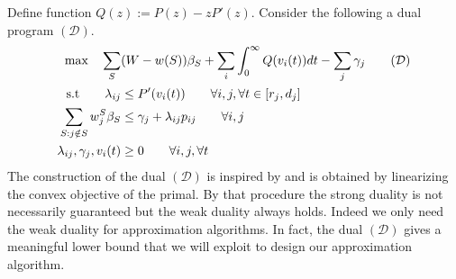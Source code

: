 \documentclass[11pt,a4paper]{article}
\begin{document}
Define function $Q(z) := P(z) - zP'(z)$. 
Consider the following a dual program $(\mathcal{D})$.
\begin{alignat}{3}
    \text{max} \quad \sum_{S} & (W - w(S))\beta_{S} 
    					+ \sum_{i}\int_{0}^{\infty} Q(v_{i}(t)) dt - \sum_{j} \gamma_{j} \tag{$\mathcal{D}$} \\
\text{s.t} \qquad \lambda_{ij} & \leq P'(v_{i}(t))   \qquad \forall i,j, \forall t \in [r_{j},d_{j}] 	\label{constr:dual-1}\\
	    				    	\sum_{S: j \notin S}w^{S}_{j}\beta_{S} &\leq  \gamma_{j} +  \lambda_{ij}p_{ij} 
							\qquad \forall i,j	\label{constr:dual-2}\\
					     \lambda_{ij}, \gamma_{j}, v_{i}(t) &\geq 0  \qquad \forall i,j, \forall t	\notag
  \end{alignat}
The construction of the dual $(\mathcal{D})$ is inspired by \cite{DevanurJain12:Online-matching} 
and is obtained by linearizing the convex objective of the primal. 
By that procedure the strong duality is not necessarily guaranteed but the weak duality always holds. 
Indeed we only need the weak duality for approximation algorithms. 
In fact, the dual $(\mathcal{D})$ gives a meaningful lower bound 
that we will exploit to design our approximation algorithm. 
\end{document}
